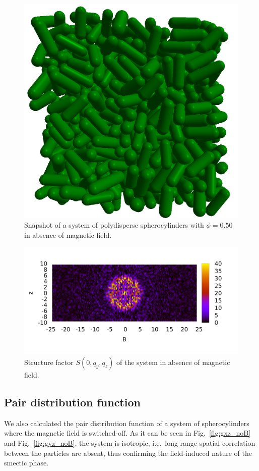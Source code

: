 \documentclass[aip,graphicx]{revtex4-1} %
\begin{document}
\begin{figure}
    \centering
    \includegraphics[width=0.5\columnwidth]{Isotropic_phase_snap.png}
    \caption{Snapshot of a system of polydisperse spherocylinders with $\phi = 0.50$ in absence of magnetic field.}\label{fig:noB_snapshot}
\end{figure}

\begin{figure}
    \centering
    \includegraphics[width=0.7\columnwidth]{Syz_noB.png}
    \caption{Structure factor $S(0, q_y, q_z)$ of the system in absence of magnetic field.}\label{fig:Syz_noB}
\end{figure}

\subsection{Pair distribution function}

We also calculated the pair distribution function of a system of spherocylinders where the magnetic field is switched-off. 
As it can be seen in Fig.~\ref{fig:gxz_noB} and Fig.~\ref{fig:gyz_noB}, the system is isotropic, i.e.~long range
spatial correlation between the particles are absent, thus confirming the field-induced nature of the smectic phase.
\end{document}
